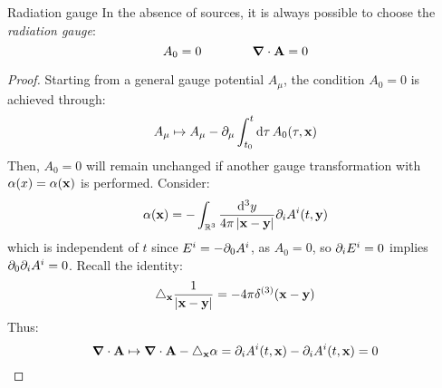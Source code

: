 \begin{theorem}{Radiation gauge}{}
  In the absence of sources, it is always possible to choose the \textit{radiation gauge}:
  \begin{equation}
    A_0 = 0
    \qquad \qquad
    \boldsymbol{\nabla} \cdot \mathbf{A} = 0
    \label{eq:radiation-gauge}
  \end{equation}
\end{theorem}

\begin{proofbox}
  \begin{proof}
    Starting from a general gauge potential $ A_\mu $, the condition $ A_0 = 0 $ is achieved through:
    \begin{equation*}
      A_\mu \mapsto A_\mu - \partial_\mu \int_{t_0}^t \mathrm{d}\tau\, A_0(\tau,\mathbf{x})
    \end{equation*}
    Then, $ A_0 = 0 $ will remain unchanged if another gauge transformation with $ \alpha(x) = \alpha(\mathbf{x}) $ is performed. Consider:
    \begin{equation*}
      \alpha(\mathbf{x}) = - \int_{\mathbb{R}^3} \frac{\mathrm{d}^3y}{4\pi \left\lvert\mathbf{x} - \mathbf{y}\right\rvert} \partial_i A^i(t,\mathbf{y})
    \end{equation*}
    which is independent of $ t $ since $ E^i = -\partial_0 A^i $, as $ A_0 = 0 $, so $ \partial_i E^i = 0 $ implies $ \partial_0 \partial_i A^i = 0 $. Recall the identity:
    \begin{equation}
      \triangle_{\mathbf{x}} \frac{1}{\left\lvert\mathbf{x} - \mathbf{y}\right\rvert} = - 4\pi \delta^{(3)}(\mathbf{x} - \mathbf{y})
    \end{equation}
    Thus:
    \begin{equation*}
      \boldsymbol{\nabla} \cdot \mathbf{A} \mapsto \boldsymbol{\nabla} \cdot \mathbf{A} - \triangle_{\mathbf{x}} \alpha = \partial_i A^i(t,\mathbf{x}) - \partial_i A^i(t,\mathbf{x}) = 0
    \end{equation*}
  \end{proof}
\end{proofbox}

